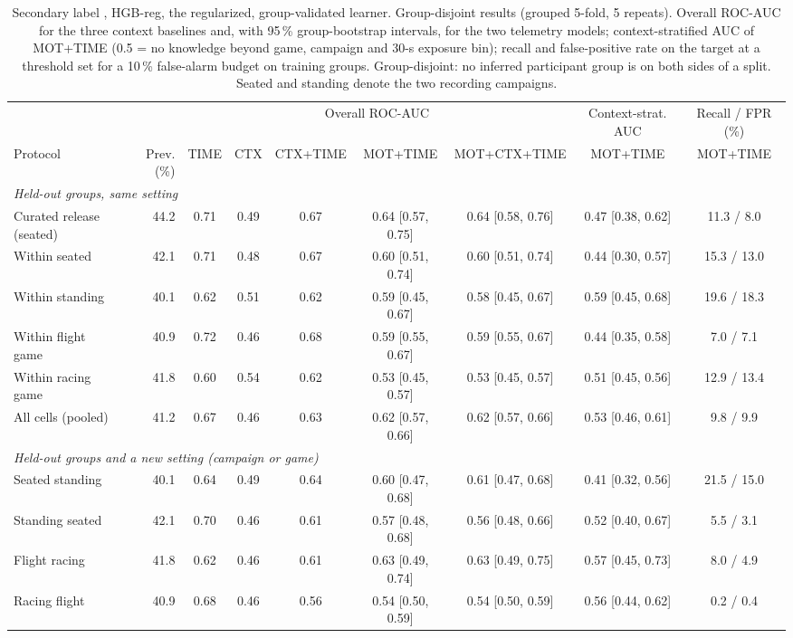 \begin{table}[t]
\centering
\footnotesize
\caption{Secondary label \sevone{}, HGB-reg, the regularized, group-validated learner. Group-disjoint results (grouped 5-fold, 5 repeats). Overall ROC-AUC for the three context baselines and, with 95\,\% group-bootstrap intervals, for the two telemetry models; context-stratified AUC of MOT+TIME (0.5 = no knowledge beyond game, campaign and 30-s exposure bin); recall and false-positive rate on the target at a threshold set for a 10\,\% false-alarm budget on training groups. Group-disjoint: no inferred participant group is on both sides of a split. Seated and standing denote the two recording campaigns.}
\label{tab:supp_s1}
\footnotesize
\setlength{\tabcolsep}{2.4pt}
\begin{tabular}{lrccccccc}
\toprule
 & & \multicolumn{5}{c}{Overall ROC-AUC} & Context-strat. AUC & Recall / FPR (\%) \\
\cmidrule(lr){3-7}\cmidrule(lr){8-8}\cmidrule(lr){9-9}
Protocol & Prev. (\%) & TIME & CTX & CTX+TIME & MOT+TIME & MOT+CTX+TIME & MOT+TIME & MOT+TIME \\
\midrule
\multicolumn{9}{l}{\emph{Held-out groups, same setting}} \\
Curated release (seated) & 44.2 & 0.71 & 0.49 & 0.67 & 0.64 [0.57, 0.75] & 0.64 [0.58, 0.76] & 0.47 [0.38, 0.62] & 11.3 / 8.0 \\
Within seated & 42.1 & 0.71 & 0.48 & 0.67 & 0.60 [0.51, 0.74] & 0.60 [0.51, 0.74] & 0.44 [0.30, 0.57] & 15.3 / 13.0 \\
Within standing & 40.1 & 0.62 & 0.51 & 0.62 & 0.59 [0.45, 0.67] & 0.58 [0.45, 0.67] & 0.59 [0.45, 0.68] & 19.6 / 18.3 \\
Within flight game & 40.9 & 0.72 & 0.46 & 0.68 & 0.59 [0.55, 0.67] & 0.59 [0.55, 0.67] & 0.44 [0.35, 0.58] & 7.0 / 7.1 \\
Within racing game & 41.8 & 0.60 & 0.54 & 0.62 & 0.53 [0.45, 0.57] & 0.53 [0.45, 0.57] & 0.51 [0.45, 0.56] & 12.9 / 13.4 \\
All cells (pooled) & 41.2 & 0.67 & 0.46 & 0.63 & 0.62 [0.57, 0.66] & 0.62 [0.57, 0.66] & 0.53 [0.46, 0.61] & 9.8 / 9.9 \\
\multicolumn{9}{l}{\emph{Held-out groups and a new setting (campaign or game)}} \\
Seated \ra{} standing & 40.1 & 0.64 & 0.49 & 0.64 & 0.60 [0.47, 0.68] & 0.61 [0.47, 0.68] & 0.41 [0.32, 0.56] & 21.5 / 15.0 \\
Standing \ra{} seated & 42.1 & 0.70 & 0.46 & 0.61 & 0.57 [0.48, 0.68] & 0.56 [0.48, 0.66] & 0.52 [0.40, 0.67] & 5.5 / 3.1 \\
Flight \ra{} racing & 41.8 & 0.62 & 0.46 & 0.61 & 0.63 [0.49, 0.74] & 0.63 [0.49, 0.75] & 0.57 [0.45, 0.73] & 8.0 / 4.9 \\
Racing \ra{} flight & 40.9 & 0.68 & 0.46 & 0.56 & 0.54 [0.50, 0.59] & 0.54 [0.50, 0.59] & 0.56 [0.44, 0.62] & 0.2 / 0.4 \\
\bottomrule
\end{tabular}
\end{table}